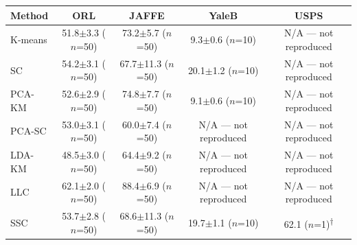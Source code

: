 \begin{tabular}{lcccc}
\toprule
Method & ORL & JAFFE & YaleB & USPS \\
\midrule
K-means & 51.8$\pm$3.3 ($n$=50) & 73.2$\pm$5.7 ($n$=50) & 9.3$\pm$0.6 ($n$=10) & N/A --- not reproduced \\
SC & 54.2$\pm$3.1 ($n$=50) & 67.7$\pm$11.3 ($n$=50) & 20.1$\pm$1.2 ($n$=10) & N/A --- not reproduced \\
PCA-KM & 52.6$\pm$2.9 ($n$=50) & 74.8$\pm$7.7 ($n$=50) & 9.1$\pm$0.6 ($n$=10) & N/A --- not reproduced \\
PCA-SC & 53.0$\pm$3.1 ($n$=50) & 60.0$\pm$7.4 ($n$=50) & N/A --- not reproduced & N/A --- not reproduced \\
LDA-KM & 48.5$\pm$3.0 ($n$=50) & 64.4$\pm$9.2 ($n$=50) & N/A --- not reproduced & N/A --- not reproduced \\
LLC & 62.1$\pm$2.0 ($n$=50) & 88.4$\pm$6.9 ($n$=50) & N/A --- not reproduced & N/A --- not reproduced \\
SSC & 53.7$\pm$2.8 ($n$=50) & 68.6$\pm$11.3 ($n$=50) & 19.7$\pm$1.1 ($n$=10) & 62.1 ($n$=1)\textsuperscript{$\dagger$} \\
\bottomrule
\end{tabular}
